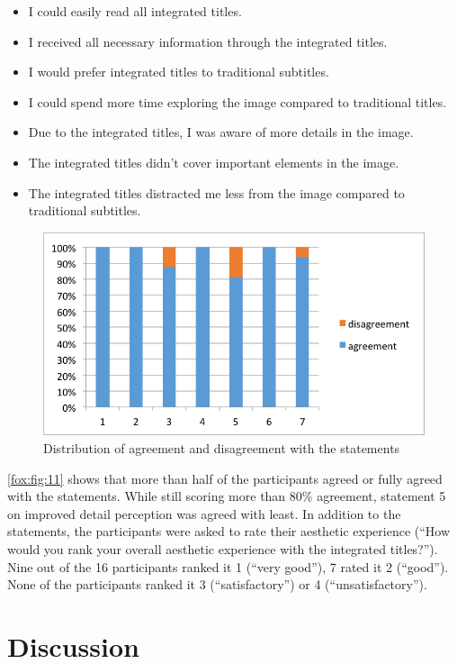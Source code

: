 \documentclass[output=paper]{langsci/langscibook}
\begin{document}
\begin{itemize}
\item I could easily read all integrated titles.
\item I received all necessary information through the integrated titles.
\item I would prefer integrated titles to traditional subtitles.
\item I could spend more time exploring the image compared to traditional titles.
\item Due to the integrated titles, I was aware of more details in the image.
\item The integrated titles didn't cover important elements in the image.
\item The integrated titles distracted me less from the image compared to traditional subtitles.
\end{itemize}

\begin{figure}
 \includegraphics[width=\textwidth]{figures/Fox11.png}
 \caption{Distribution of agreement and disagreement with the statements}
 \label{fox:fig:11}
\end{figure} 


\autoref{fox:fig:11} shows that more than half of the participants agreed or fully agreed with the statements. While still scoring more than 80\% agreement, statement 5 on improved detail perception was agreed with least. In addition to the statements, the participants were asked to rate their aesthetic experience (``How would you rank your overall aesthetic experience with the integrated titles?''). Nine out of the 16 participants ranked it 1 (``very good''), 7 rated it 2 (``good''). None of the participants ranked it 3 (``satisfactory'') or 4 (``unsatisfactory'').


\section{Discussion}
\end{document}

